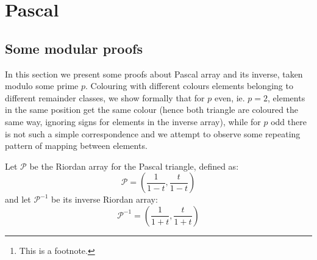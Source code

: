 \documentclass[10pt,a4paper]{article} %
\begin{document}
    \title{\rmfamily\normalfont{}}
    \author{ \\ }
    \date{\today} 
    
    \maketitle
    
    \begin{abstract}
        \noindent\lipsum[1] Just a test.\footnote{This is a footnote.}
    \end{abstract}
       
    \tableofcontents
    
    \section{Pascal}

    \subsection{Some modular proofs}
    
    In this section we present some proofs about Pascal array and its
    inverse, taken modulo some prime $p$. Colouring with different
    colours elements belonging to different remainder classes, we show
    formally that for $p$ even, ie. $p=2$, elements in the same
    position get the same colour (hence both triangle are coloured the
    same way, ignoring signs for elements in the inverse array), while
    for $p$ odd there is not such a simple correspondence and we
    attempt to observe some repeating pattern of mapping between
    elements.

    Let $\mathcal{P}$ be the Riordan array for the Pascal triangle,
    defined as:
    \begin{displaymath} 
        \mathcal{P} = \left(\frac{1}{1-t}, \frac{t}{1-t}  \right)
    \end{displaymath} 
    and let $\mathcal{P}^{-1}$ be its inverse Riordan array:
    \begin{displaymath} 
        \mathcal{P}^{-1} = \left(\frac{1}{1+t}, \frac{t}{1+t}  \right)
    \end{displaymath} 
    
\end{document}
